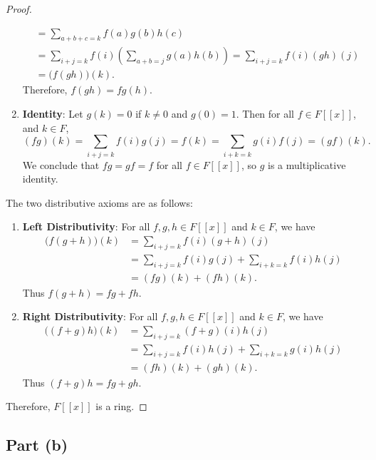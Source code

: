 \documentclass[11pt]{article}
\begin{document}
\begin{proof}
\begin{enumerate}
\begin{align*}
        &= \sum\limits_{a + b + c = k} f(a)g(b)h(c) \\
        &= \sum\limits_{i + j = k} f(i) \left( \sum\limits_{a + b = j} g(a)h(b)  \right) = \sum\limits_{i + j = k} f(i)(gh)(j)  \\
        &= \big( f(gh) \big)(k).
      \end{align*}
      Therefore, $f(gh) = fg(h)$.
      \item \textbf{Identity}: Let $g(k) = 0$ if $k \ne 0$ and $g(0) = 1$. Then for all $f \in F[[x]]$, and $k \in F$,
      \[
        (fg)(k) = \sum\limits_{i + j = k} f(i)g(j) = f(k) = \sum\limits_{i + k = k} g(i)f(j) = (gf)(k).
      \]
      We conclude that $fg = gf = f$ for all $f \in F[[x]]$, so $g$ is a multiplicative identity.
  \end{enumerate}
  The two distributive axioms are as follows:
  \begin{enumerate}\addtocounter{enumi}{8}
    \item \textbf{Left Distributivity}: For all $f, g, h \in F[[x]]$ and $k \in F$, we have
    \begin{align*}
      \big( f(g + h) \big)(k) &= \sum\limits_{i + j = k} f(i)(g + h)(j) \\
                              &= \sum\limits_{i + j = k} f(i)g(j) + \sum\limits_{i + k = k} f(i)h(j) \\
                              &= (fg)(k) + (fh)(k).
    \end{align*}
    Thus $f(g + h) = fg + fh$.
    \item \textbf{Right Distributivity}: For all $f, g, h \in F[[x]]$ and $k \in F$, we have
    \begin{align*}
      \big( (f + g)h \big)(k) &= \sum\limits_{i + j = k} (f + g)(i)h(j) \\
                              &= \sum\limits_{i + j = k} f(i)h(j) + \sum\limits_{i + k = k} g(i)h(j) \\
                              &= (fh)(k) + (gh)(k).
    \end{align*}
    Thus $(f + g)h = fg + gh$.
  \end{enumerate}
  Therefore, $F[[x]]$ is a ring.
\end{proof}

\newpage


\subsection{Part (b)}
\end{document}
